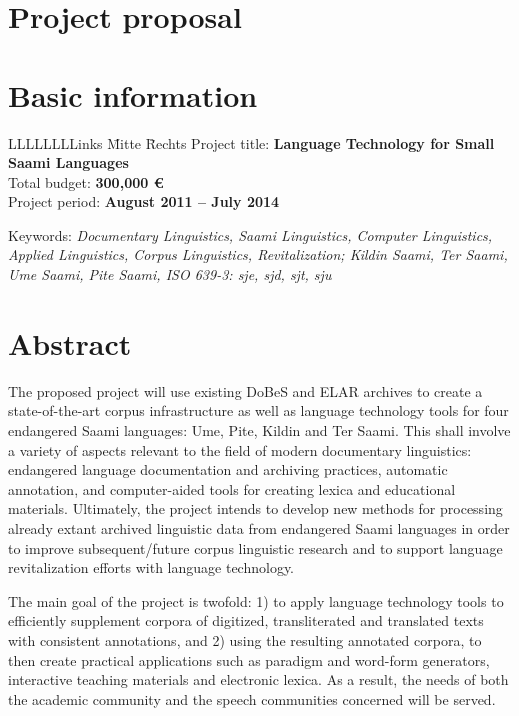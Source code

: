 \documentclass[a4paper,12pt]{article}
\begin{document}
\newpage

\section*{Project proposal}

\section{Basic information}

\begin{tabbing}
LLLLLLLLinks \= Mitte \= Rechts \kill
Project title: \>\textbf{Language Technology for Small Saami Languages}\\
Total budget: \>\textbf{300,000 €}\\
Project period: \>\textbf{August 2011 – July 2014}\\
\end{tabbing}
Keywords: {\it Documentary Linguistics, Saami Linguistics, Computer Linguistics, Applied Linguistics, Corpus Linguistics, Revitalization; Kildin Saami, Ter Saami, Ume Saami, Pite Saami, ISO 639-3: sje, sjd, sjt, sju}

\section{Abstract}%
The proposed project will use existing DoBeS and ELAR archives to create a state-of-the-art corpus infrastructure as well as language technology tools for four endangered Saami languages: Ume, Pite, Kildin and Ter Saami. This shall involve a variety of aspects relevant to the field of modern documentary linguistics: endangered language documentation and archiving practices, automatic annotation, and computer-aided tools for creating lexica and educational materials. Ultimately, the project intends to develop new methods for processing already extant archived linguistic data from endangered Saami languages in order to improve subsequent/future corpus linguistic research and to support language revitalization efforts with language technology.

The main goal of the project is twofold: 1) to apply language technology tools to efficiently supplement corpora of digitized, transliterated and translated texts with consistent annotations, and 2) using the resulting annotated corpora, to then create practical applications such as paradigm and word-form generators, interactive teaching materials and electronic lexica. As a result, the needs of both the academic community and the speech communities concerned will be served.
\end{document}

